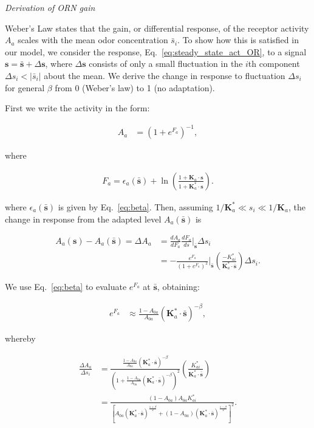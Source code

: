 \documentclass[10pt,prl,aps,showpacs,twocolumn,unsortedaddress,showkeys,linenumbers]{revtex4-1}
\begin{document}
\textit{Derivation of ORN gain} \\


{\color {blue} 

Weber's Law states that the gain, or differential response, of the receptor activity $A_a$ scales with the mean odor concentration $\bar s_i$. To show how this is satisfied in our model, we consider the response, Eq.~\ref{eq:steady_state_act_OR}, to a signal $\mathbf{s} = \bar {\mathbf{s}} + \Delta \mathbf{s}$, where $\Delta \mathbf s$ consists of only a small fluctuation in the $i$th component $\Delta s_i < |\bar s_i|$ about the mean. We derive the change in response to fluctuation $\Delta s_i$ for general $\beta$ from 0 (Weber's law) to 1 (no adaptation).

First we write the activity in the form:

\begin{align}
A_a &= (1 + e^{F_a})^{-1},
\end{align}

where

\begin{align}
F_a = \epsilon_a(\bar {\mathbf s}) + 
    \ln\left(\frac
    {1 + \mathbf{K}_a\cdot {\mathbf{s}}} 
    {1 + \mathbf{K}^*_a\cdot {\mathbf{s}}} 
    \right).
\end{align}

where $\epsilon_a(\bar {\mathbf s})$ is given by Eq.~\ref{eq:beta}.
Then, assuming $1/\mathbf{K}^*_a \ll s_i \ll 1/\mathbf{K}_a$, the change in response from the adapted level $A_a(\bar {\mathbf s})$ is

\begin{align}
    A_a(\mathbf s) - A_a(\bar {\mathbf s}) = {\Delta A_a}%
    &= \frac{dA_a}{dF_a}\frac{dF_a}{ds}\bigg|_{\bar {\mathbf s}}\Delta s_i \nonumber \\
    &= -\frac{e^{F_a}}{(1 + e^{F_a})^2}\bigg|_{\bar {\mathbf s}}
    \left(\frac{-K^*_{ai}}{\mathbf{K}^*_a\cdot \bar {\mathbf{s}}}\right) \Delta s_i.
\end{align}

We use Eq.~\ref{eq:beta} to evaluate $e^{F_a}$ at $\bar {\mathbf s}$, obtaining:

\begin{align}
    e^{F_a} &\approx \frac{1 - A_{0a}}{A_{0a}}
    (\mathbf{K}^*_a\cdot \bar {\mathbf{s}})^{-\beta},
\end{align}

whereby

\begin{align}
    \frac{\Delta A_a}
    {\Delta s_i}%
    &= 
    \frac{
    \frac{1 - A_{0a}}{A_{0a}}
    (\mathbf{K}^*_a\cdot \bar {\mathbf{s}})^{-\beta}
    }
    {(1 + \frac{1 - A_{0a}}{A_{0a}}
    (\mathbf{K}^*_a\cdot \bar {\mathbf{s}})^{-\beta})^2
    }
    \left(\frac{K^*_{ai}}{\mathbf{K}^*_a\cdot \bar {\mathbf{s}}}\right)\nonumber \\
    &=\frac{(1 - A_{0a})A_{0a}K^*_{ai}}
    {
    [
    A_{0a}(\mathbf{K}^*_a\cdot 
    \bar {\mathbf{s}})^{\frac{1+\beta}{2}}
    +
    (1 - A_{0a})(\mathbf{K}^*_a\cdot 
    \bar {\mathbf{s}})^{\frac{1-\beta}{2}}
    ]^2
    }.
    \label{eq:full_gain_eq}
\end{align}


}
\end{document}
